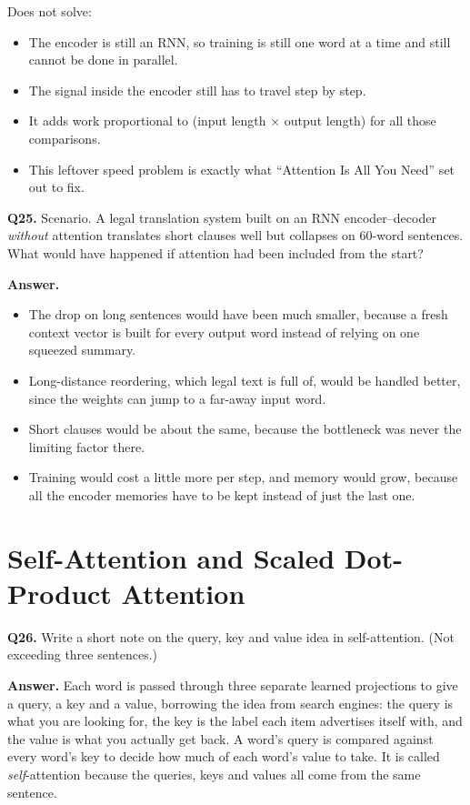 \documentclass[11pt]{article}
\begin{document}
Does not solve:
\begin{itemize}
  \item The encoder is still an RNN, so training is still one word at a time and still cannot be done in parallel.
  \item The signal inside the encoder still has to travel step by step.
  \item It adds work proportional to (input length $\times$ output length) for all those comparisons.
  \item This leftover speed problem is exactly what ``Attention Is All You Need'' set out to fix.
\end{itemize}

\medskip
\textbf{Q25.} Scenario. A legal translation system built on an RNN encoder--decoder
\emph{without} attention translates short clauses well but collapses on 60-word sentences.
What would have happened if attention had been included from the start?

\textbf{Answer.}
\begin{itemize}
  \item The drop on long sentences would have been much smaller, because a fresh context vector is built for every output word instead of relying on one squeezed summary.
  \item Long-distance reordering, which legal text is full of, would be handled better, since the weights can jump to a far-away input word.
  \item Short clauses would be about the same, because the bottleneck was never the limiting factor there.
  \item Training would cost a little more per step, and memory would grow, because all the encoder memories have to be kept instead of just the last one.
\end{itemize}

\section{Self-Attention and Scaled Dot-Product Attention}

\textbf{Q26.} Write a short note on the query, key and value idea in self-attention. (Not
exceeding three sentences.)

\textbf{Answer.} Each word is passed through three separate learned projections to give a
query, a key and a value, borrowing the idea from search engines: the query is what you are
looking for, the key is the label each item advertises itself with, and the value is what you
actually get back. A word's query is compared against every word's key to decide how much of
each word's value to take. It is called \emph{self}-attention because the queries, keys and
values all come from the same sentence.
\end{document}
